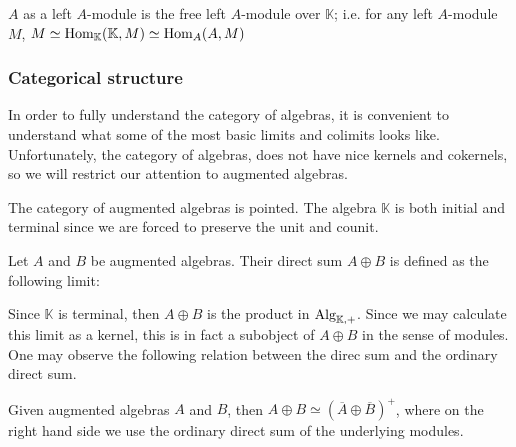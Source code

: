 \documentclass[../thesis.tex]{subfiles}
\begin{document}
                \begin{corollary}
                    $A$ as a left $A$-module is the free left $A$-module over $\mathbb{K}$; i.e. for any left $A$-module $M$, $M \simeq \tt{Hom}_\mathbb{K}(\mathbb{K}, M) \simeq \tt{Hom}_A(A,M)$
                \end{corollary}
            
            \subsubsection*{Categorical structure}

                In order to fully understand the category of algebras, it is convenient to understand what some of the most basic limits and colimits looks like. Unfortunately, the category of algebras, does not have nice kernels and cokernels, so we will restrict our attention to augmented algebras.

                The category of augmented algebras is pointed. The algebra $\mathbb{K}$ is both initial and terminal since we are forced to preserve the unit and counit.

                \begin{definition}
                    Let $A$ and $B$ be augmented algebras. Their direct sum $A \oplus B$ is defined as the following limit:
                    \begin{center}
                    \end{center}
                \end{definition}

                Since $\mathbb{K}$ is terminal, then $A \oplus B$ is the product in $\tt{Alg}_{\mathbb{K},+}$. Since we may calculate this limit as a kernel, this is in fact a subobject of $A \oplus B$ in the sense of modules. One may observe the following relation between the direc sum and the ordinary direct sum.

                \begin{lemma}
                    Given augmented algebras $A$ and $B$, then $A \oplus B \simeq (\overline{A} \oplus \overline{B})^+$, where on the right hand side we use the ordinary direct sum of the underlying modules.
                \end{lemma}
\end{document}
